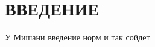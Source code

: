 \chapter*{ВВЕДЕНИЕ}

У Мишани введение норм и так сойдет

\begin{comment}
Современные приложения должны обрабатывать запросы миллионов пользователей одновременно, а также возвращать каждому пользователю правильный текст, видео, изображения и другие данные. Для обработки таких значительных объемов трафика в большинстве приложений используется множество серверов ресурсов с дублированием данных между ними.
Балансировка нагрузки направляет и контролирует интернет-трафик между серверами приложений и их посетителями или клиентами. В результате повышается доступность, масштабируемость, безопасность и производительность приложения \cite{balance}.

Системы, работающие с высокой нагрузкой, такие как веб-серверы, облачные платформы, базы данных и другие, требуют эффективной балансировки нагрузки для обеспечения стабильной и надежной работы.


Цель работы - исследование методов балансировки высоконагруженных систем.

В вычислительной технике балансировка нагрузки улучшает распределение рабочих нагрузок по нескольким вычислительным ресурсам: компьютерам, компьютерным кластерам, сетевым подключениям, центральным процессорам или дисковым устройствам. Балансировка нагрузки призвана оптимизировать использование ресурсов, максимально увеличить пропускную способность, минимизировать время отклика и избежать перегрузки отдельных ресурсов. Применение вместо одного компонента нескольких компонентов с балансировкой может повысить надёжность и доступность благодаря получившемуся запасу мощностей. Балансировка нагрузки обычно подразумевает использование специального ПО или оборудования вроде многоуровневого коммутатора или DNS-сервера.\cite{3}


На заре развития, компьютеры (или ЭВМ, электронно-вычислительные машины) были очень дорогим и штучным инструментом, позволить которые могли себе только наиболее крупные институты и предприятия.
Вычислительные ресурсы приходилось экономить всеми возможными способами.
Первые разработчики писали код в режиме «офлайн» и передавали их оператору ЭВМ, который последовательно вводил программы в машину и производил расчеты.
В начале 1960-х годов зародилась концепция разделения времени – распределение вычислительных ресурсов между несколькими пользователями: пока один вводит данные, машина занимается расчетами других 
С увеличением масштабов компьютерных систем --- когда они начали состоять из сотен единиц --- и ростом мощности, механизмы разделения времени перестали быть актуальными.
Понадобились средства, которые бы управляли нагрузкой на множестве компьютеров сразу \cite{1}. 
\end{comment}

